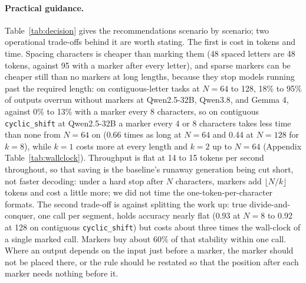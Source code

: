 \documentclass[10pt]{article} %
\newcommand{\task}[1]{\texttt{#1}}
\begin{document}
\paragraph{Practical guidance.} Table~\ref{tab:decision} gives the recommendations scenario by scenario; two operational trade-offs behind it are worth stating. The first is cost in tokens and time. Spacing characters is cheaper than marking them (48 spaced letters are 48 tokens, against 95 with a marker after every letter), and sparse markers can be cheaper still than no markers at long lengths, because they stop models running past the required length: on contiguous-letter tasks at $N = 64$ to 128, 18\% to 95\% of outputs overrun without markers at Qwen2.5-32B, Qwen3.8, and Gemma 4, against 0\% to 13\% with a marker every 8 characters, so on contiguous \task{cyclic\_shift} at Qwen2.5-32B a marker every 4 or 8 characters takes less time than none from $N = 64$ on (0.66 times as long at $N = 64$ and 0.44 at $N = 128$ for $k = 8$), while $k = 1$ costs more at every length and $k = 2$ up to $N = 64$ (Appendix Table~\ref{tab:wallclock}). Throughput is flat at 14 to 15 tokens per second throughout, so that saving is the baseline's runaway generation being cut short, not faster decoding: under a hard stop after $N$ characters, markers add $\lfloor N/k \rfloor$ tokens and cost a little more; we did not time the one-token-per-character formats. The second trade-off is against splitting the work up: true divide-and-conquer, one call per segment, holds accuracy nearly flat (0.93 at $N = 8$ to 0.92 at 128 on contiguous \task{cyclic\_shift}) but costs about three times the wall-clock of a single marked call. Markers buy about 60\% of that stability within one call. Where an output depends on the input just before a marker, the marker should not be placed there, or the rule should be restated so that the position after each marker needs nothing before it.
\end{document}
